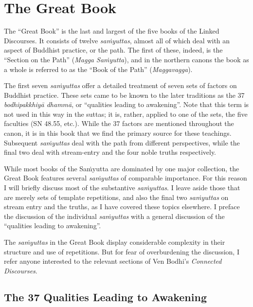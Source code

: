 \documentclass[12pt,openany]{book}%
\begin{document}
\section*{The Great Book}

The “Great Book” is the last and largest of the five books of the Linked Discourses. It consists of twelve \textit{\textsanskrit{saṁyuttas}}, almost all of which deal with an aspect of Buddhist practice, or the path. The first of these, indeed, is the “Section on the Path” (\textit{Magga \textsanskrit{Saṁyutta}}), and in the northern canons the book as a whole is referred to as the “Book of the Path” (\textit{Maggavagga}).

The first seven \textit{\textsanskrit{saṁyuttas}} offer a detailed treatment of seven sets of factors on Buddhist practice. These sets came to be known to the later traditions as the 37 \textit{\textsanskrit{bodhipakkhiyā} \textsanskrit{dhammā}}, or “qualities leading to awakening”. Note that this term is not used in this way in the suttas; it is, rather, applied to one of the sets, the five faculties (SN 48.55, etc.). While the 37 factors are mentioned throughout the canon, it is in this book that we find the primary source for these teachings. Subsequent \textit{\textsanskrit{saṁyuttas}} deal with the path from different perspectives, while the final two deal with stream-entry and the four noble truths respectively.

While most books of the \textsanskrit{Saṁyutta} are dominated by one major collection, the Great Book features several \textit{\textsanskrit{saṁyuttas}} of comparable importance. For this reason I will briefly discuss most of the substantive \textit{\textsanskrit{saṁyuttas}}. I leave aside those that are merely sets of template repetitions, and also the final two \textit{\textsanskrit{saṁyuttas}} on stream entry and the truths, as I have covered these topics elsewhere. I preface the discussion of the individual \textit{\textsanskrit{saṁyuttas}} with a general discussion of the “qualities leading to awakening”.

The \textit{\textsanskrit{saṁyuttas}} in the Great Book display considerable complexity in their structure and use of repetitions. But for fear of overburdening the discussion, I refer anyone interested to the relevant sections of Ven Bodhi’s \textit{Connected Discourses}.

\subsection*{The 37 Qualities Leading to Awakening}
\end{document}
